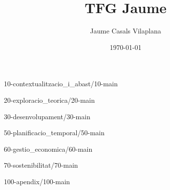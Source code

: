 \documentclass[a4paper, 12pt]{report}
\title{TFG Jaume}
\author{Jaume Casals Vilaplana}
\date{\today}
\begin{document}

\clearpage


\clearpage


\clearpage

{10-contextualitzacio_i_abast/10-main}
\clearpage

{20-exploracio_teorica/20-main}
\clearpage

{30-desenvolupament/30-main}
\clearpage


{50-planificacio_temporal/50-main}
\clearpage

{60-gestio_economica/60-main}
\clearpage

{70-sostenibilitat/70-main}
\clearpage



{100-apendix/100-main}
\clearpage

\printbibliography[title={Referències}]

\appendix

\afterpage{\null\newpage}
\end{document}
